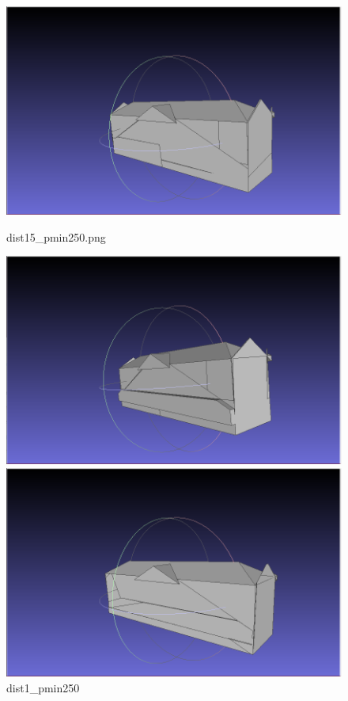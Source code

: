 \documentclass{article}
\begin{document}
  \begin{figure}[H]
    \centering
    \begin{minipage}[b]{0.45\textwidth}
      \includegraphics[width=\textwidth]{../../images/screen_kinetic/dist1_5_pmin_250.png}
      \caption{dist15\_pmin250.png}
      \label{fig:dist15_pmin220}
    \end{minipage}
    \hfill
    \begin{minipage}[b]{0.45\textwidth}
      \includegraphics[width=\textwidth]{../../images/screen_kinetic/dist1_pmin250.png}
      \caption{dist1\_pmin250}
      \label{fig:dist1_pmin250}
    \end{minipage}
    \hfill
    \begin{minipage}[b]{0.45\textwidth}
      \includegraphics[width=\textwidth]{../../images/screen_kinetic/dist_0_3_pmin_250.png}

\end{minipage}
\end{figure}
\end{document}

